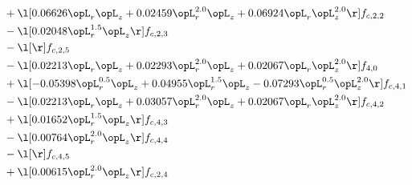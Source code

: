 \begin{alignat}{2}
& + \l[  0.06626 \opL_r \opL_z +  0.02459 \opL_r^{2.0} \opL_z +  0.06924 \opL_r \opL_z^{2.0}  \r] f_{c,2,2} \nonumber \\ 
& - \l[  0.02048 \opL_r^{1.5} \opL_z  \r] f_{c,2,3} \nonumber \\ 
& - \l[  \r] f_{c,2,5} \nonumber \\ 
& - \l[  0.02213 \opL_r \opL_z +  0.02293 \opL_r^{2.0} \opL_z +  0.02067 \opL_r \opL_z^{2.0}  \r] f_{4,0} \nonumber \\ 
& + \l[  -0.05398 \opL_r^{0.5} \opL_z +  0.04955 \opL_r^{1.5} \opL_z   -0.07293 \opL_r^{0.5} \opL_z^{2.0}  \r] f_{c,4,1} \nonumber \\ 
& - \l[  0.02213 \opL_r \opL_z +  0.03057 \opL_r^{2.0} \opL_z +  0.02067 \opL_r \opL_z^{2.0}  \r] f_{c,4,2} \nonumber \\ 
& + \l[  0.01652 \opL_r^{1.5} \opL_z  \r] f_{c,4,3} \nonumber \\ 
& - \l[  0.00764 \opL_r^{2.0} \opL_z  \r] f_{c,4,4} \nonumber \\ 
& - \l[  \r] f_{c,4,5} \nonumber \\ 
& + \l[  0.00615 \opL_r^{2.0} \opL_z  \r] f_{c,2,4} \nonumber \\ 
\end{alignat} 


